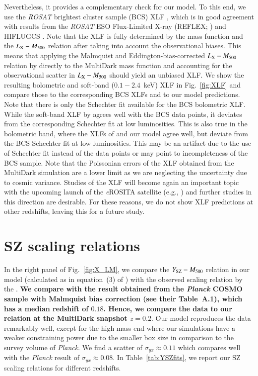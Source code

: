 \documentclass[useAMS,usenatbib]{mn2e}
\begin{document}
Nevertheless, it provides a complementary check for our model. To this end, we
use the \emph{ROSAT} brightest cluster sample (BCS) XLF
\citep{1997ApJ...479L.101E}, which is in good agreement with results from the
\emph{ROSAT} ESO Flux-Limited X-ray (REFLEX; \citealp{2002ApJ...566...93B}) and
HIFLUGCS \citep{2002ApJ...567..716R}.  Note that the XLF is fully determined by
the mass function and the $L_{{\mathrm{X}}}-M_{500}$ relation after taking into
account the observational biases. This means that applying the Malmquist and
Eddington-bias-corrected $L_{{\mathrm{X}}}-M_{500}$ relation by
\cite{2010MNRAS.406.1773M} directly to the MultiDark mass function and
accounting for the observational scatter in $L_{{\mathrm{X}}}-M_{500}$ should yield
an unbiased XLF. We show the resulting bolometric and soft-band ($0.1-2.4$~keV)
XLF in Fig.~\ref{fig:XLF} and compare those to the corresponding BCS XLFs and
to our model predictions. Note that there is only the Schechter fit available
for the BCS bolometric XLF.  While the soft-band XLF by
\cite{2010MNRAS.406.1773M} agrees well with the BCS data points, it deviates
from the corresponding Schechter fit at low luminosities. This is also true in
the bolometric band, where the XLFs of \cite{2010MNRAS.406.1773M} and our model
agree well, but deviate from the BCS Schechter fit at low luminosities. This may
be an artifact due to the use of Schechter fit instead of the data points or may
point to incompleteness of the BCS sample. Note that the Poissonian errors of
the XLF obtained from the MultiDark simulation are a lower limit as we are
neglecting the uncertainty due to cosmic variance.  Studies of the XLF will
become again an important topic with the upcoming launch of the \emph{e}ROSITA
satellite (e.g., \citealp{2011MSAIS..17..159C}) and further studies in this
direction are desirable. For these reasons, we do not show XLF predictions at
other redshifts, leaving this for a future study.


\section{SZ scaling relations}
\label{sec:5}
In the right panel of Fig.~\ref{fig:X_LM}, we compare the
$Y_{{\mathrm{SZ}}}-M_{500}$ relation in our model (calculated as in equation~(3) of
\citealp{2011arXiv1109.3709B}) with the observed scaling relation by the
\cite{2013arXiv1303.5080P}. {\bf We compare with the result obtained from the 
\emph{Planck} COSMO sample with Malmquist bias correction (see their Table~A.1),
which has a median redshift of $0.18$. Hence, we compare the data to our relation 
at the MultiDark snapshot $z=0.2$}. Our model reproduces the data remarkably well, except 
for the high-mass end where our simulations have a weaker constraining power due to the 
smaller box size in comparison to the survey volume of {\em Planck}. We find a scatter of
$\sigma_{yx} \approx 0.11$ which compares well with the \emph{Planck} result of
$\sigma_{yx} \approx 0.08$. In Table~\ref{tab:YSZfits}, we report our SZ scaling
relations for different redshifts.
\end{document}
